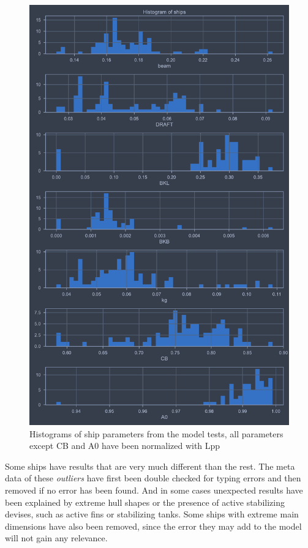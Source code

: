 \begin{figure}[H]
    \centering
    \includegraphics[width=0.9\columnwidth]{figures/ship_parameters.pdf}
    \caption{Histograms of ship parameters from the model tests, all parameters except CB and A0 have been normalized with Lpp}
    \label{fig:ship_parameters}
\end{figure}



Some ships have results that are very much different than the rest. The meta data of these  \emph{outliers} have first been double checked for typing errors and then removed if no error has been found. And in some cases unexpected results have been explained by extreme hull shapes or the presence of active stabilizing devises, such as active fins or stabilizing tanks.
Some ships with extreme main dimensions have also been removed, since the error they may add to the model will not gain any relevance.



